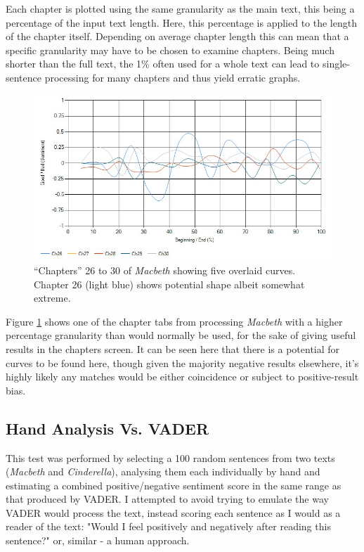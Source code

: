 \documentclass{article}
\begin{document}
{            Each chapter is plotted using the same granularity as the main text, this being a percentage of the input text length. Here, this percentage is applied to the length of the chapter itself. Depending on average chapter length this can mean that a specific granularity may have to be chosen to examine chapters. Being much shorter than the full text, the 1\% often used for a whole text can lead to single-sentence processing for many chapters and thus yield erratic graphs.
            \begin{figure}
                \includegraphics[width=1\textwidth]{Figures/Chap/Macbeth}
                \centering
                \caption{``Chapters'' 26 to 30 of \textit{Macbeth} showing five overlaid curves. Chapter 26 (light blue) shows potential shape albeit somewhat extreme.} 
                \label{fig:macbethChap}
            \end{figure}
            Figure \ref{fig:macbethChap} shows one of the chapter tabs from processing \textit{Macbeth} with a higher percentage granularity than would normally be used, for the sake of giving useful results in the chapters screen. It can be seen here that there is a potential for curves to be found here, though given the majority negative results elsewhere, it's highly likely any matches would be either coincidence or subject to positive-result bias.
    \subsection{Hand Analysis Vs. VADER}
    \label{subsec:handAnalysis}
        This test was performed by selecting a 100 random sentences from two texts (\textit{Macbeth} and \textit{Cinderella}), analysing them each individually by hand and estimating a combined positive/negative sentiment score in the same range as that produced by VADER. I attempted to avoid trying to emulate the way VADER would process the text, instead scoring each sentence as I would as a reader of the text: "Would I feel positively and negatively after reading this sentence?" or, similar - a human approach.
        
}
\end{document}
